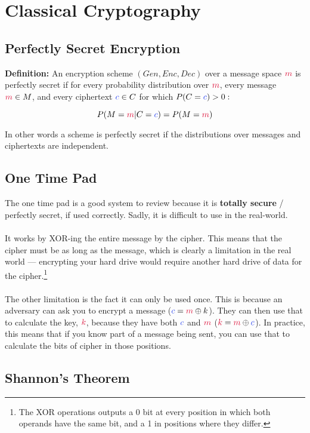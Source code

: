 \chapter{Classical Cryptography}

\section{Perfectly Secret Encryption}
	\textbf{Definition:} An encryption scheme $(Gen,Enc,Dec)$ over a message space $\cm$ is perfectly secret if for every probability distribution over $\cm$, every message $\cm \in M$, and every ciphertext $\cc \in C$ for which $P(C=\cc)>0:$

	$$P(M=\cm|C=\cc)=P(M=\cm)$$

	In other words a scheme is perfectly secret if the distributions over messages and ciphertexts are independent.

\section{One Time Pad}
	The one time pad is a good system to review because it is \textbf{totally secure} / perfectly secret, if used correctly. Sadly, it is difficult to use in the real-world.\\
	\\
	It works by XOR-ing the entire message by the cipher. This means that the cipher must be as long as the message, which is clearly a limitation in the real world --- encrypting your hard drive would require another hard drive of data for the cipher.\footnote{The XOR operations outputs a 0 bit at every position in which both operands have the same bit, and a 1 in positions where they differ.}\\
	\\
	The other limitation is the fact it can only be used once. This is because an adversary  can ask you to encrypt a message ($\cc=\cm\oplus k$). They can then use that to calculate the key, $\ck$,  because they have both $\cc$ and $\cm$ ($\ck=\cm\oplus \cc$). In practice, this means that if you know part of a message being sent, you can use that to calculate the bits of cipher in those positions.

\section{Shannon's Theorem}
	
